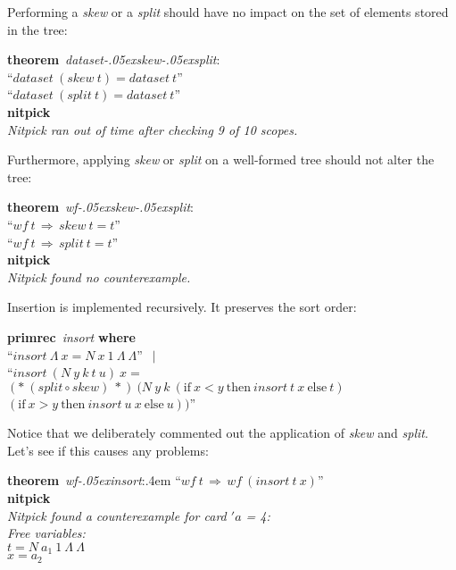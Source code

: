 \documentclass[a4paper,12pt]{article}
\renewcommand\_{\hbox{\textunderscore\kern-.05ex}}
\begin{document}
Performing a \textit{skew} or a \textit{split} should have no impact on the set
of elements stored in the tree:

\prew
\textbf{theorem}~\textit{dataset\_skew\_split\/}:\\
``$\textit{dataset}~(\textit{skew}~t) = \textit{dataset}~t$'' \\
``$\textit{dataset}~(\textit{split}~t) = \textit{dataset}~t$'' \\
\textbf{nitpick} \\[2\smallskipamount]
{\slshape Nitpick ran out of time after checking 9 of 10 scopes.}
\postw

Furthermore, applying \textit{skew} or \textit{split} on a well-formed tree
should not alter the tree:

\prew
\textbf{theorem}~\textit{wf\_skew\_split\/}:\\
``$\textit{wf}~t\,\Longrightarrow\, \textit{skew}~t = t$'' \\
``$\textit{wf}~t\,\Longrightarrow\, \textit{split}~t = t$'' \\
\textbf{nitpick} \\[2\smallskipamount]
{\slshape Nitpick found no counterexample.}
\postw

Insertion is implemented recursively. It preserves the sort order:

\prew
\textbf{primrec}~\textit{insort} \textbf{where} \\
``$\textit{insort}~\Lambda~x = N~x~1~\Lambda~\Lambda$'' $\,\mid$ \\
``$\textit{insort}~(N~y~k~t~u)~x =$ \\
\phantom{``}$({*}~(\textit{split} \circ \textit{skew})~{*})~(N~y~k~(\textrm{if}~x < y~\textrm{then}~\textit{insort}~t~x~\textrm{else}~t)$ \\
$(\textrm{if}~x > y~\textrm{then}~\textit{insort}~u~x~\textrm{else}~u))$''
\postw

Notice that we deliberately commented out the application of \textit{skew} and
\textit{split}. Let's see if this causes any problems:

\prew
\textbf{theorem}~\textit{wf\_insort\/}:\kern.4em ``$\textit{wf}~t\,\Longrightarrow\, \textit{wf}~(\textit{insort}~t~x)$'' \\
\textbf{nitpick} \\[2\smallskipamount]
\slshape Nitpick found a counterexample for \textit{card} $'a$ = 4: \\[2\smallskipamount]
\hbox{}\qquad Free variables: \nopagebreak \\
\hbox{}\qquad\qquad $t = N~a_1~1~\Lambda~\Lambda$ \\
\hbox{}\qquad\qquad $x = a_2$
\postw
\end{document}
